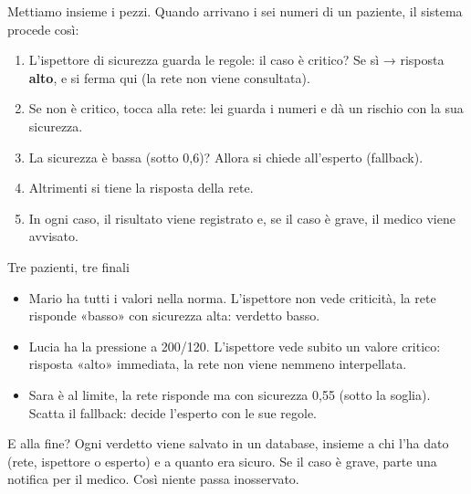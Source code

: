Mettiamo insieme i pezzi. Quando arrivano i sei numeri di un paziente, il
sistema procede così:

\begin{enumerate}
  \item L'ispettore di sicurezza guarda le regole: il caso è critico? Se sì
        → risposta \textbf{alto}, e si ferma qui (la rete non viene
        consultata).
  \item Se non è critico, tocca alla rete: lei guarda i numeri e dà un rischio
        con la sua sicurezza.
  \item La sicurezza è bassa (sotto 0,6)? Allora si chiede all'esperto
        (fallback).
  \item Altrimenti si tiene la risposta della rete.
  \item In ogni caso, il risultato viene registrato e, se il caso è grave, il
        medico viene avvisato.
\end{enumerate}

\begin{esempio}{Tre pazienti, tre finali}
\begin{itemize}
  \item Mario ha tutti i valori nella norma. L'ispettore non vede criticità,
        la rete risponde «basso» con sicurezza alta: verdetto basso.
  \item Lucia ha la pressione a 200/120. L'ispettore vede subito un valore
        critico: risposta «alto» immediata, la rete non viene nemmeno
        interpellata.
  \item Sara è al limite, la rete risponde ma con sicurezza 0,55 (sotto la
        soglia). Scatta il fallback: decide l'esperto con le sue regole.
\end{itemize}
\end{esempio}

\begin{esempio}{E alla fine?}
Ogni verdetto viene salvato in un database, insieme a chi l'ha dato (rete,
ispettore o esperto) e a quanto era sicuro. Se il caso è grave, parte una
notifica per il medico. Così niente passa inosservato.
\end{esempio}
